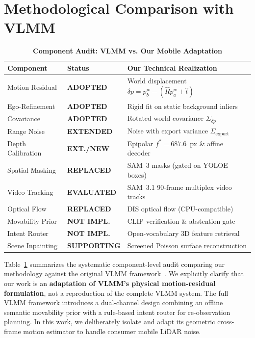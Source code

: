 \documentclass[conference]{IEEEtran}
\begin{document}
\section{Methodological Comparison with VLMM}

\begin{table}[t]
\caption{\textbf{Component Audit: VLMM vs. Our Mobile Adaptation}}
\label{tab:vlmm_comparison}
\centering
\scriptsize
\setlength{\tabcolsep}{2.5pt}
\begin{tabularx}{\columnwidth}{@{}l l X@{}}
\toprule
\textbf{Component} & \textbf{Status} & \textbf{Our Technical Realization} \\
\midrule
Motion Residual & \textbf{ADOPTED} & World displacement $\delta p = p_b^w - (\hat{R} p_a^w + \hat{t})$ \\
Ego-Refinement & \textbf{ADOPTED} & Rigid fit on static background inliers \\
Covariance & \textbf{ADOPTED} & Rotated world covariance $\Sigma_{\delta p}$ \\
Range Noise & \textbf{EXTENDED} & Noise with export variance $\Sigma_{\mathrm{export}}$ \\
Depth Calibration & \textbf{EXT./NEW} & Epipolar $f^*=687.6$~px \& affine decoder \\
Spatial Masking & \textbf{REPLACED} & SAM~3 masks (gated on YOLOE boxes) \\
Video Tracking & \textbf{EVALUATED} & SAM~3.1 90-frame multiplex video tracks \\
Optical Flow & \textbf{REPLACED} & DIS optical flow (CPU-compatible) \\
Movability Prior & \textbf{NOT IMPL.} & CLIP verification \& abstention gate \\
Intent Router & \textbf{NOT IMPL.} & Open-vocabulary 3D feature retrieval \\
Scene Inpainting & \textbf{SUPPORTING} & Screened Poisson surface reconstruction \\
\bottomrule
\end{tabularx}
\end{table}

Table~\ref{tab:vlmm_comparison} summarizes the systematic component-level audit comparing our methodology against the original VLMM framework~\cite{vlmm2026}. We explicitly clarify that our work is an \textbf{adaptation of VLMM's physical motion-residual formulation}, not a reproduction of the complete VLMM system. The full VLMM framework introduces a dual-channel design combining an offline semantic movability prior with a rule-based intent router for re-observation planning. In this work, we deliberately isolate and adapt its geometric cross-frame motion estimator to handle consumer mobile LiDAR noise.
\end{document}
